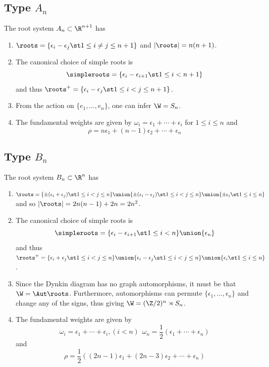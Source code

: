 \documentclass[11pt,leqno,oneside]{amsart}
\numberwithin{thm}{section}
\newcommand{\halfsum}{\rho}
\renewcommand{\Sym}{S}
\begin{document}
\subsection{Type \(A_n\)}
\begin{prop}
The root system \(A_n \subset \R^{n+1}\) has
\begin{enumerate}
\item \(\roots = \{\epsilon_i - \epsilon_j \st 1 \leq i \neq j \leq
  n+1\}\) and \(|\roots| = n(n+1)\).
\item The canonical choice of simple roots is \[
    \simpleroots = \{\epsilon_i - \epsilon_{i+1} \st 1 \leq i < n+1\}
  \]
  and thus \(\roots^+ = \{\epsilon_i-\epsilon_j \st 1 \leq i < j \leq
  n+1\}\).
\item From the action on \(\{e_1, \ldots, e_n\}\), one can infer
  \(\W = \Sym_n\). 
\item The fundamental weights are given by \(\omega_i =
  \epsilon_1+\cdots+\epsilon_i\) for \(1 \leq i \leq n\) and \[
    \halfsum = n \epsilon_1 + (n-1) \epsilon_2 + \cdots + \epsilon_n
  \]
\end{enumerate}
\end{prop}
\subsection{Type \(B_n\)}
\begin{prop}
  The root system \(B_n \subset \R^n\) has
  \begin{enumerate}
  \item \(\roots = \{\pm(\epsilon_i + \epsilon_j) \st 1 \leq i < j
    \leq n\} \union \{\pm (\epsilon_i - \epsilon_j) \st 1 \leq i < j
    \leq n\} \union \{\pm \epsilon_i \st 1 \leq i \leq n\}\) and so
    \(|\roots| = 2n(n-1)+2n = 2n^2\).
  \item The canonical choice of simple roots is \[
      \simpleroots = \{\epsilon_i - \epsilon_{i+1} \st 1 \leq  i < n\}
      \union \{\epsilon_n\}
    \]
    and thus \(\roots^+ = \{\epsilon_i+\epsilon_j \st 1 \leq i < j
    \leq n\} \union \{\epsilon_i-\epsilon_j \st 1 \leq i < j
    \leq n\} \union \{\epsilon_i \st 1 \leq i \leq n\}\).
  \item Since the Dynkin diagram has no graph automorphisms, it must
    be that \(\W = \Aut \roots\). Furthermore, automorphisms can
    permute \(\{\epsilon_1, \ldots, \epsilon_n\}\) and change any of
    the signs, thus giving \(\W = (\Z/2)^n \rtimes \Sym_n\).
  \item The fundamental weights are given by \[
      \omega_i = \epsilon_1 + \cdots + \epsilon_i, (i < n) \ \ \omega_n
      = \frac{1}{2}(\epsilon_1 + \cdots + \epsilon_n)
    \]
    and \[
      \halfsum = \frac{1}{2}((2n-1)\epsilon_1 + (2n-3)\epsilon_2 +
      \cdots + \epsilon_n)
    \]
  \end{enumerate}
\end{prop}
\end{document}
